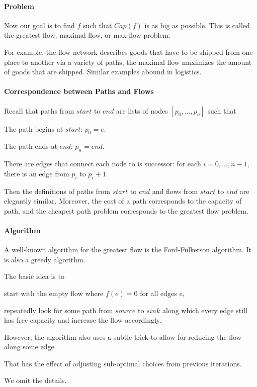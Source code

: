 \paragraph{Problem}
Now our goal is to find $f$ such that $Cap(f)$ is as big as possible.
This is called the greatest flow, maximal flow, or max-flow problem.

For example, the flow network describes goods that have to be shipped from one place to another via a variety of paths, the maximal flow maximizes the amount of goods that are shipped.
Similar examples abound in logistics.

\paragraph{Correspondence between Paths and Flows}
Recall that paths from $start$ to $end$ are lists of nodes $[p_0,\ldots,p_n]$ such that
\begin{compactitem}
 \item The path begins at $start$: $p_0=e$.
 \item The path ends at $end$: $p_n=end$.
 \item There are edges that connect each node to is successor: for each $i=0,\ldots,n-1$, there is an edge from $p_i$ to $p_i+1$.
\end{compactitem}

Then the definitions of paths from $start$ to $end$ and flows from $start$ to $end$ are elegantly similar.
Moreover, the cost of a path corresponds to the capacity of path, and the cheapest path problem corresponds to the greatest flow problem.

\paragraph{Algorithm}
A well-known algorithm for the greatest flow is the Ford-Fulkerson algorithm.
It is also a greedy algorithm.

The basic idea is to
\begin{compactitem}
\item start with the empty flow where $f(e)=0$ for all edges $e$,
\item repeatedly look for some path from $source$ to $sink$ along which every edge still has free capacity and increase the flow accordingly.
\end{compactitem}
However, the algorithm also uses a subtle trick to allow for reducing the flow along some edge.

That has the effect of adjusting sub-optimal choices from previous iterations.

We omit the details.
